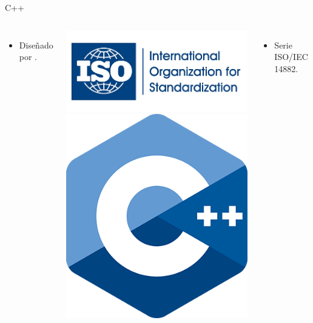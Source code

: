 \begin{frame}[t]{C++}
\begin{columns}[T]
\begin{itemize}
  \item Diseñado por .
\end{itemize}

\pause
\includegraphics[width=.5\textwidth]{images/logo-iso.png}
\includegraphics[width=.2\textwidth]{images/logo-cpp.png}

\begin{itemize}
  \item Serie ISO/IEC 14882.
\end{itemize}


\end{columns}
\end{frame}
